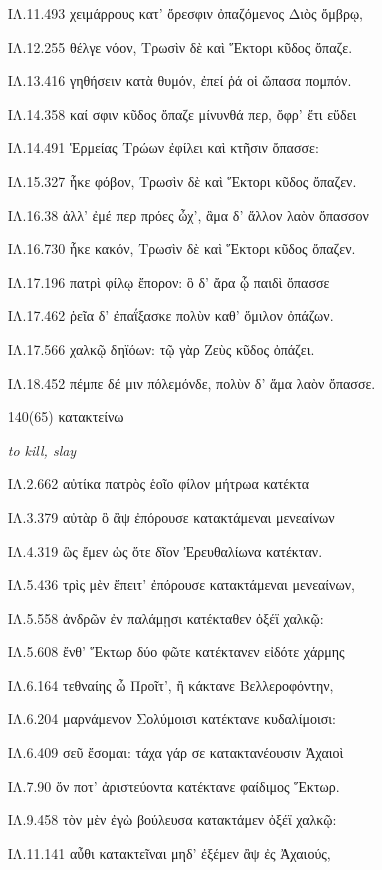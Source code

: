 \begin{enumerate}
{ΙΛ.11.493 χειμάρρους κατ' ὄρεσφιν ὀπαζόμενος Διὸς ὄμβρῳ,

ΙΛ.12.255 θέλγε νόον, Τρωσὶν δὲ καὶ Ἕκτορι κῦδος ὄπαζε.

ΙΛ.13.416 γηθήσειν κατὰ θυμόν, ἐπεί ῥά οἱ ὤπασα πομπόν.

ΙΛ.14.358 καί σφιν κῦδος ὄπαζε μίνυνθά περ, ὄφρ' ἔτι εὕδει

ΙΛ.14.491 Ἑρμείας Τρώων ἐφίλει καὶ κτῆσιν ὄπασσε:

ΙΛ.15.327 ἧκε φόβον, Τρωσὶν δὲ καὶ Ἕκτορι κῦδος ὄπαζεν.

ΙΛ.16.38 ἀλλ' ἐμέ περ πρόες ὦχ', ἃμα δ' ἄλλον λαὸν ὄπασσον

ΙΛ.16.730 ἧκε κακόν, Τρωσὶν δὲ καὶ Ἕκτορι κῦδος ὄπαζεν.

ΙΛ.17.196 πατρὶ φίλῳ ἔπορον: ὃ δ' ἄρα ᾧ παιδὶ ὄπασσε

ΙΛ.17.462 ῥεῖα δ' ἐπαΐξασκε πολὺν καθ' ὅμιλον ὀπάζων.

ΙΛ.17.566 χαλκῷ δηϊόων: τῷ γὰρ Ζεὺς κῦδος ὀπάζει.

ΙΛ.18.452 πέμπε δέ μιν πόλεμόνδε, πολὺν δ' ἅμα λαὸν ὄπασσε.

}

\clearpage
\item[\large 140(65)]{\large \g κατακτείνω	}

\hspace{0.2cm} \textit{ to kill, slay }

{\g
ΙΛ.2.662 αὐτίκα πατρὸς ἑοῖο φίλον μήτρωα κατέκτα

ΙΛ.3.379 αὐτὰρ ὃ ἂψ ἐπόρουσε κατακτάμεναι μενεαίνων

ΙΛ.4.319 ὣς ἔμεν ὡς ὅτε δῖον Ἐρευθαλίωνα κατέκταν.

ΙΛ.5.436 τρὶς μὲν ἔπειτ' ἐπόρουσε κατακτάμεναι μενεαίνων,

ΙΛ.5.558 ἀνδρῶν ἐν παλάμῃσι κατέκταθεν ὀξέϊ χαλκῷ:

ΙΛ.5.608 ἔνθ' Ἕκτωρ δύο φῶτε κατέκτανεν εἰδότε χάρμης

ΙΛ.6.164 τεθναίης ὦ Προῖτ', ἢ κάκτανε Βελλεροφόντην,

ΙΛ.6.204 μαρνάμενον Σολύμοισι κατέκτανε κυδαλίμοισι:

ΙΛ.6.409 σεῦ ἔσομαι: τάχα γάρ σε κατακτανέουσιν Ἀχαιοὶ

ΙΛ.7.90 ὅν ποτ' ἀριστεύοντα κατέκτανε φαίδιμος Ἕκτωρ.

ΙΛ.9.458 τὸν μὲν ἐγὼ βούλευσα κατακτάμεν ὀξέϊ χαλκῷ:

ΙΛ.11.141 αὖθι κατακτεῖναι μηδ' ἐξέμεν ἂψ ἐς Ἀχαιούς,

}
\end{enumerate}
